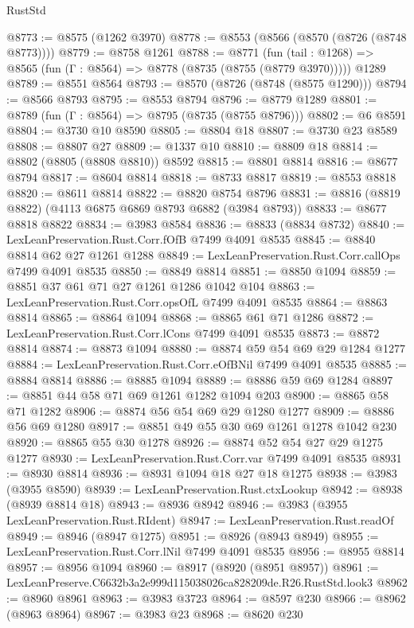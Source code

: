 \begin{lexlean}{RustStd}
\begin{coremodule}
@8773 := @8575 (@1262 @3970)
@8778 := @8553 (@8566 (@8570 (@8726 (@8748 @8773))))
@8779 := @8758 @1261
@8788 := @8771
    (fun (tail : @1268) => @8565 (fun (Γ : @8564) => @8778 (@8735 (@8755 (@8779 @3970)))))
    @1289
@8789 := @8551 @8564
@8793 := @8570 (@8726 (@8748 (@8575 @1290)))
@8794 := @8566 @8793
@8795 := @8553 @8794
@8796 := @8779 @1289
@8801 := @8789 (fun (Γ : @8564) => @8795 (@8735 (@8755 @8796)))
@8802 := @6 @8591
@8804 := @3730 @10 @8590
@8805 := @8804 @18
@8807 := @3730 @23 @8589
@8808 := @8807 @27
@8809 := @1337 @10
@8810 := @8809 @18
@8814 := @8802 (@8805 (@8808 @8810)) @8592
@8815 := @8801 @8814
@8816 := @8677 @8794
@8817 := @8604 @8814
@8818 := @8733 @8817
@8819 := @8553 @8818
@8820 := @8611 @8814
@8822 := @8820 @8754 @8796
@8831 := @8816 (@8819 @8822) (@4113 @6875 @6869 @8793 @6882 (@3984 @8793))
@8833 := @8677 @8818 @8822
@8834 := @3983 @8584
@8836 := @8833 (@8834 @8732)
@8840 := LexLeanPreservation.Rust.Corr.fOfB @7499 @4091 @8535
@8845 := @8840 @8814 @62 @27 @1261 @1288
@8849 := LexLeanPreservation.Rust.Corr.callOps @7499 @4091 @8535
@8850 := @8849 @8814
@8851 := @8850 @1094
@8859 := @8851 @37 @61 @71 @27 @1261 @1286 @1042 @104
@8863 := LexLeanPreservation.Rust.Corr.opsOfL @7499 @4091 @8535
@8864 := @8863 @8814
@8865 := @8864 @1094
@8868 := @8865 @61 @71 @1286
@8872 := LexLeanPreservation.Rust.Corr.lCons @7499 @4091 @8535
@8873 := @8872 @8814
@8874 := @8873 @1094
@8880 := @8874 @59 @54 @69 @29 @1284 @1277
@8884 := LexLeanPreservation.Rust.Corr.eOfBNil @7499 @4091 @8535
@8885 := @8884 @8814
@8886 := @8885 @1094
@8889 := @8886 @59 @69 @1284
@8897 := @8851 @44 @58 @71 @69 @1261 @1282 @1094 @203
@8900 := @8865 @58 @71 @1282
@8906 := @8874 @56 @54 @69 @29 @1280 @1277
@8909 := @8886 @56 @69 @1280
@8917 := @8851 @49 @55 @30 @69 @1261 @1278 @1042 @230
@8920 := @8865 @55 @30 @1278
@8926 := @8874 @52 @54 @27 @29 @1275 @1277
@8930 := LexLeanPreservation.Rust.Corr.var @7499 @4091 @8535
@8931 := @8930 @8814
@8936 := @8931 @1094 @18 @27 @18 @1275
@8938 := @3983 (@3955 @8590)
@8939 := LexLeanPreservation.Rust.ctxLookup
@8942 := @8938 (@8939 @8814 @18)
@8943 := @8936 @8942
@8946 := @3983 (@3955 LexLeanPreservation.Rust.RIdent)
@8947 := LexLeanPreservation.Rust.readOf
@8949 := @8946 (@8947 @1275)
@8951 := @8926 (@8943 @8949)
@8955 := LexLeanPreservation.Rust.Corr.lNil @7499 @4091 @8535
@8956 := @8955 @8814
@8957 := @8956 @1094
@8960 := @8917 (@8920 (@8951 @8957))
@8961 := LexLeanPreserve.C6632b3a2e999d115038026ca828209de.R26.RustStd.look3
@8962 := @8960 @8961
@8963 := @3983 @3723
@8964 := @8597 @230
@8966 := @8962 (@8963 @8964)
@8967 := @3983 @23
@8968 := @8620 @230

\end{coremodule}
\end{lexlean}
